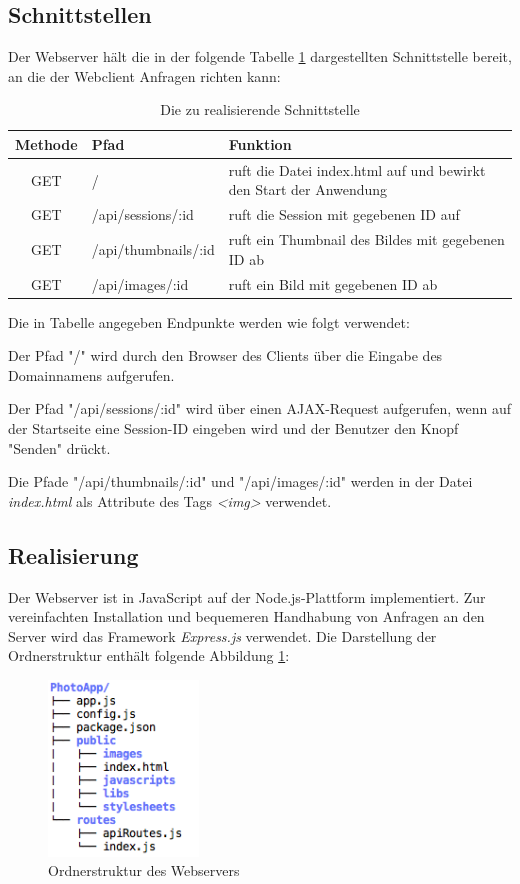 \subsection{Schnittstellen}
Der Webserver hält die in der folgende Tabelle \ref{tab_api_routes} dargestellten Schnittstelle bereit, an die der Webclient 
Anfragen richten kann:
\begin{table}[h]
	\begin{center}
		\begin{tabularx}{\textwidth}{|c|l|X|}
			\hline
			\textbf{Methode} & \textbf{Pfad} & \textbf{Funktion}\\
			\hline
			GET & / & ruft die Datei index.html auf und bewirkt den Start der Anwendung \\
			\hline
			GET & /api/sessions/:id & ruft die Session mit gegebenen ID auf \\
			\hline
			GET & /api/thumbnails/:id & ruft ein Thumbnail des Bildes mit gegebenen ID ab \\
			\hline
			GET & /api/images/:id & ruft ein Bild mit gegebenen ID ab \\
			\hline
		\end{tabularx}
		\caption{Die zu realisierende Schnittstelle}
		\label{tab_api_routes}
	\end{center}
\end{table}

Die in Tabelle angegeben Endpunkte werden wie folgt verwendet:

Der Pfad "/"{} wird durch den Browser des Clients über die Eingabe des Domainnamens aufgerufen.

Der Pfad "/api/sessions/:id"{} wird über einen AJAX-Request aufgerufen, wenn auf der Startseite eine Session-ID 
eingeben wird und der Benutzer den Knopf  "Senden" drückt.

Die Pfade "/api/thumbnails/:id"{} und "/api/images/:id"{} werden in der Datei \textit{index.html} als Attribute des Tags \textit{\textless img\textgreater} verwendet.

\subsection{Realisierung}
Der Webserver ist in JavaScript auf der Node.js-Plattform implementiert. Zur vereinfachten Installation und bequemeren Handhabung von Anfragen an den Server wird das Framework \textit{Express.js} verwendet. 
\clearpage
Die Darstellung der Ordnerstruktur enthält folgende Abbildung \ref{fig_struktur_webserver}:
\begin{figure}[h]
	\centering
	\includegraphics[width=4cm]{bilder/ordnerstruktur_photoapp}
	\caption{Ordnerstruktur des Webservers}
	\label{fig_struktur_webserver}
\end{figure}

